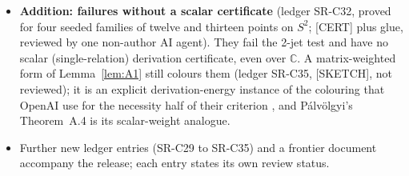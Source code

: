 \documentclass[11pt]{amsart}
\newcommand{\st}[1]{\textsf{[#1]}}
\newcommand{\C}{\mathbb{C}}
\theoremstyle{plain}
\theoremstyle{definition}
\begin{document}
\begin{itemize}
(no quadric relation) and Theorem~\ref{thm:rank} (circle, one parameter), there without the regularity
hypothesis. A literature sweep (2026-10-15) found no prior statement of it. Its order-zero case is
OpenAI's Proposition~7.3, and its cases with algebraic coordinates, or with at most $m+4$ points in
affine dimension $m$, are prior work \cite{JDJones}; the new content is positive transcendence degree
together with quadric relations.
\item \textbf{Addition: failures without a scalar certificate} (ledger SR-C32, proved for four seeded
families of twelve and thirteen points on $S^2$; \st{CERT} plus glue, reviewed by one non-author AI
agent). They fail the 2-jet test and have no scalar (single-relation) derivation certificate, even over
$\C$. A matrix-weighted form of Lemma~\ref{lem:A1} still colours them (ledger SR-C35, \st{SKETCH},
not reviewed); it is an explicit derivation-energy instance of the colouring that OpenAI use for the
necessity half of their criterion \cite[Prop.~2.4]{OAI172}, and P\'alv\"olgyi's Theorem~A.4 is its
scalar-weight analogue.
\item Further new ledger entries (SR-C29 to SR-C35) and a frontier document accompany the release; each
entry states its own review status.
\end{itemize}
\end{document}
